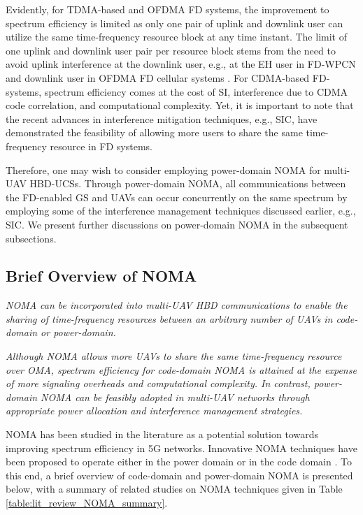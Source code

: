 Evidently, for TDMA-based and OFDMA FD systems, the improvement to spectrum efficiency is limited as only one pair of uplink and downlink user can utilize the same time-frequency resource block at any time instant. The limit of one uplink and downlink user pair per resource block stems from the need to avoid uplink interference at the downlink user, e.g., at the EH user in FD-WPCN \cite{kang2015full} and downlink user in OFDMA FD cellular systems \cite{zhang2019max}. For CDMA-based FD-systems, spectrum efficiency comes at the cost of SI, interference due to CDMA code correlation, and computational complexity. Yet, it is important to note that the recent advances in interference mitigation techniques, e.g., SIC, have demonstrated the feasibility of allowing more users to share the same time-frequency resource in FD systems.

Therefore, one may wish to consider employing power-domain NOMA for multi-UAV HBD-UCSs. Through power-domain NOMA, all communications between the FD-enabled GS and UAVs can occur concurrently on the same spectrum by employing some of the interference management techniques discussed earlier, e.g., SIC. We present further discussions on power-domain NOMA in the subsequent subsections.

\subsection{Brief Overview of NOMA}
\begin{summary}
\emph{\emph{
NOMA can be incorporated into multi-UAV HBD communications to enable the sharing of time-frequency resources between an arbitrary number of UAVs in code-domain or power-domain. 
}}
\end{summary}
\begin{summary}
\emph{\emph{
Although NOMA allows more UAVs to share the same time-frequency resource over OMA, spectrum efficiency for code-domain NOMA is attained at the expense of more signaling overheads and computational complexity. In contrast, power-domain NOMA can be feasibly adopted in multi-UAV networks through appropriate power allocation and interference management strategies. 
}}
\end{summary}

NOMA has been studied in the literature as a potential solution towards improving spectrum efficiency in 5G networks. Innovative NOMA techniques have been proposed to operate either in the power domain or in the code domain \cite{islam2017power,dai2018survey}. To this end, a brief overview of code-domain and power-domain NOMA is presented below, with a summary of related studies on NOMA techniques given in Table \ref{table:lit_review_NOMA_summary}.

